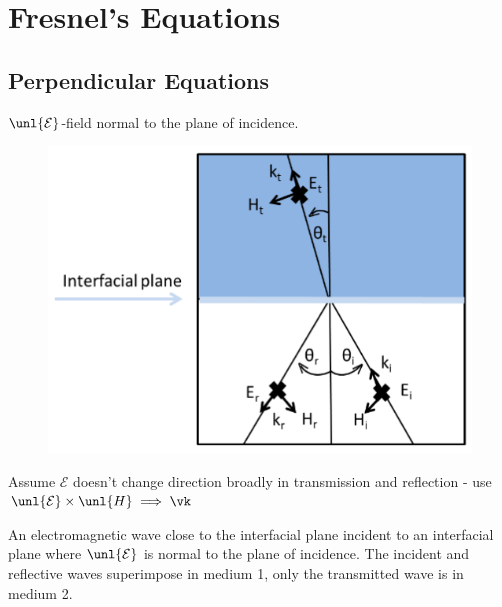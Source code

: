 \documentclass[a4paper, 11pt, normalem]{report}
\renewcommand\E{\mathcal{E}}
\newcommand\uE{\unl{\E}}
\begin{document}
\section{Fresnel's Equations}
\subsection{Perpendicular Equations}
$\uE$-field normal to the plane of incidence.

\begin{figure}[H]
	\centering
	\includegraphics[scale=0.4]{normfres.png}
\end{figure}

Assume $\E$ doesn't change direction broadly in transmission and reflection - use $\uE \times \unl{H} \implies \vk$

An electromagnetic wave close to the interfacial plane incident to an interfacial plane where $\uE$ is normal to the plane of incidence.
The incident and reflective waves superimpose in medium 1, only the transmitted wave is in medium 2.
\end{document}
